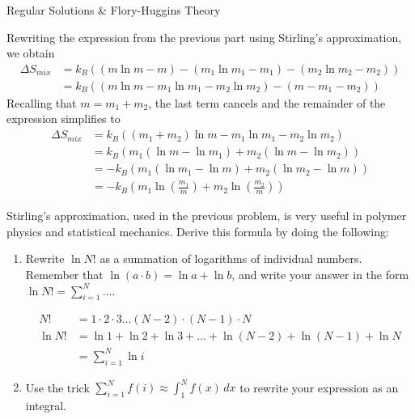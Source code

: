 \begin{activity}{Regular Solutions \& Flory-Huggins Theory}
\begin{exercises}
\begin{enumerate}
					\begin{solution}{}
						Rewriting the expression from the previous part using Stirling's approximation, we obtain
						\begin{align*}
							\Delta S_{mix} &= k_B((m \ln m - m) - (m_1 \ln m_1 -m_1) - (m_2 \ln m_2 - m_2))\\
								&= k_B((m\ln m - m_1 \ln m_1 - m_2 \ln m_2) - (m - m_1 - m_2))
						\end{align*}
						Recalling that $m = m_1 + m_2$, the last term cancels and the remainder of the expression simplifies to
						\begin{align*}
							\Delta S_{mix} &= k_B((m_1 + m_2) \ln m - m_1 \ln m_1 - m_2 \ln m_2)\\
								&= k_B(m_1(\ln m - \ln m_1) + m_2(\ln m - \ln m_2))\\
								&= -k_B(m_1(\ln m_1 - \ln m) + m_2(\ln m_2 - \ln m))\\
								&= -k_B\left( m_1 \ln \left(\frac{m_1}{m} \right) + m_2 \ln \left(\frac{m_2}{m}\right)\right) 
						\end{align*}
					
					\end{solution}
					
			\end{enumerate}



		\exercise Stirling's approximation, used in the previous problem, is very useful in polymer physics and statistical mechanics.  Derive this formula by doing the following:
			\begin{enumerate}
				\item Rewrite $\ln N!$ as a summation of logarithms of individual numbers.  Remember that $\ln (a\cdot b) = \ln a + \ln b$, and write your answer in the form $\ln N! = \sum_{i=1}^N \dots$.
				
					\begin{solution}{}
						\begin{align*}
							N! &= 1\cdot 2 \cdot 3 \dots (N-2) \cdot (N-1) \cdot N \\
							\ln N! &= \ln 1 + \ln 2 + \ln 3 + ... + \ln(N-2) + \ln(N-1) + \ln N\\
							&= \sum_{i=1}^N \ln i
						\end{align*}
					\end{solution}
					
				\item Use the trick $\sum_{i=1}^{N} f(i) \approx \int_1^N f(x)\,dx$ to rewrite your expression as an integral.
				

\end{enumerate}
\end{exercises}
\end{activity}
